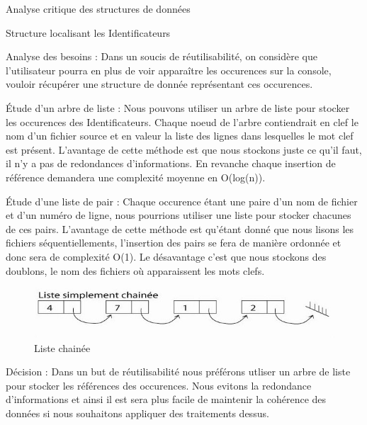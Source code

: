 \documentclass{article}
\begin{document}
\begin{section}{Analyse critique des structures de données}
\begin{subsection}{Structure localisant les Identificateurs}
\begin{paragraph}{Analyse des besoins :}
    Dans un soucis de réutilisabilité, on considère que l'utilisateur pourra en plus de voir apparaître les occurences
    sur la console, vouloir récupérer une structure de donnée représentant ces occurences.
    \end{paragraph}

    \begin{paragraph}{Étude d'un arbre de liste :}
    Nous pouvons utiliser un arbre de liste pour stocker les occurences des Identificateurs. Chaque noeud de l'arbre contiendrait en clef le nom d'un fichier source
    et en valeur la liste des lignes dans lesquelles le mot clef est présent. L'avantage de cette méthode est que nous stockons juste ce qu'il faut, il n'y a pas de redondances
    d'informations. En revanche chaque insertion de référence demandera une complexité moyenne en O(log(n)).
  
    \end{paragraph}
    
    \begin{paragraph}{Étude d'une liste de pair :}
      Chaque occurence étant une paire d'un nom de fichier et d'un numéro de ligne, nous pourrions utiliser une liste pour stocker chacunes de ces pairs.
      L'avantage de cette méthode est qu'étant donné que nous lisons les fichiers séquentiellements, l'insertion des pairs se fera de manière ordonnée et donc sera de complexité O(1).
      Le désavantage c'est que nous stockons des doublons, le nom des fichiers où apparaissent les mots clefs.
  
        \begin{figure}[htp]
    \centering
    \includegraphics[scale=0.5]{images/liste.jpg}
    \caption{Liste chainée}
    \end{figure}
    \end{paragraph}
      \FloatBarrier

    \begin{paragraph}{Décision :}
      Dans un but de réutilisabilité nous préférons utliser un arbre de liste pour stocker les références des occurences. Nous evitons la redondance d'informations
      et ainsi il est sera plus facile de maintenir la cohérence des données si nous souhaitons appliquer des traitements dessus.
    \end{paragraph}
    
  \end{subsection}

\end{section}
\end{document}
